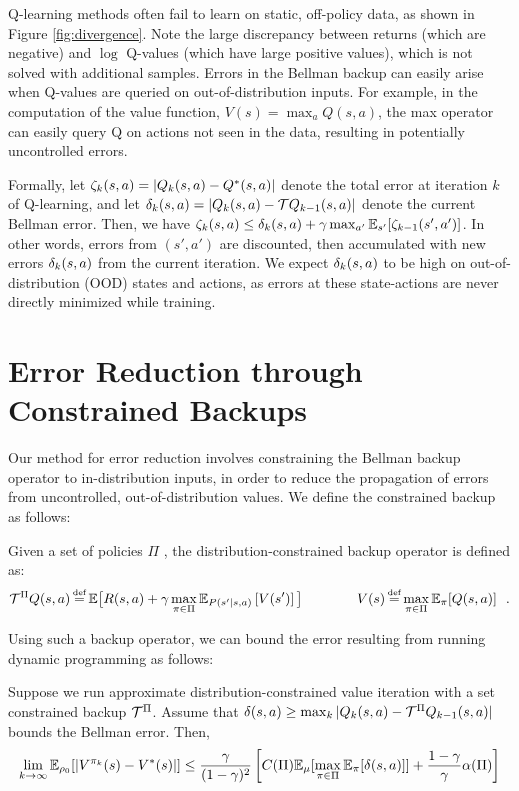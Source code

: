 \documentclass{article}
\begin{document}
Q-learning methods often fail to learn on static, off-policy data, as shown in Figure \ref{fig:divergence}. Note the large discrepancy between returns (which are negative) and $\log$ Q-values (which have large positive values), which is not solved with additional samples. Errors in the Bellman backup can easily arise when Q-values are queried on out-of-distribution inputs. For example, in the computation of the value function, $V(s) = \max_a Q(s,a)$, the max operator can easily query Q on actions not seen in the data, resulting in potentially uncontrolled errors.

Formally, let $\zeta_k(s, a) = |Q_k(s,a) - Q^*(s,a)|$ denote the total error at iteration $k$ of Q-learning, and let $\delta_k(s, a) = |Q_k(s,a) - \mathcal{T} Q_{k-1}(s,a)|$ denote the current Bellman error. Then, we have \mbox{$\zeta_k(s, a) \le \delta_k(s,a) + \gamma \max_{a'} \mathbb{E}_{s'}[\zeta_{k-1}(s',a')]$}. In other words, errors from $(s', a')$ are discounted, then accumulated with new errors $\delta_k(s, a)$ from the current iteration. We expect $\delta_k(s,a)$ to be high on out-of-distribution (OOD) states and actions, as errors at these state-actions are never directly minimized while training.



\vspace{-10pt}
\section{Error Reduction through Constrained Backups}
\vspace{-10pt}

Our method for error reduction involves constraining the Bellman backup operator to in-distribution inputs, in order to reduce the propagation of errors from uncontrolled, out-of-distribution values. We define the constrained backup as follows:
\begin{definition}
Given a set of policies $\Pi$
, the distribution-constrained backup operator is defined as:
\begin{align*}
\TPi Q(s, a) \defeq \expec \big[ R(s, a) + \gamma \max_{\pi \in \Pi} \expec_{\trans(s' | s, a)}\left[V(s') \right] \big]
\ \ \ \ \ \ \ \ \ \ \ \ 
V(s) \defeq \max_{\pi \in \Pi} \expec_{\pi}[Q(s, a)]\ \ .
\end{align*}
\end{definition}
Using such a backup operator, we can bound the error resulting from running dynamic programming as follows:
\begin{theorem}
\label{thm:avi_bound}
Suppose we run approximate distribution-constrained value iteration with a set constrained backup $\mathcal{T}^\Pi$. Assume that $\delta(s,a) \ge \max_k |Q_k(s,a) - \mathcal{T}^\Pi Q_{k-1}(s,a)|$ bounds the Bellman error. Then,
\[\lim_{k \to \infty} \mathbb{E}_{{\rho_0}}[|V^{\pi_k}(s) - V^*(s)|] \le
\frac{\gamma}{(1-\gamma)^2}\left[ C(\Pi)\mathbb{E}_\mu[\max_{\pi \in \Pi} \mathbb{E}_{\pi}[\delta(s,a)]] + \frac{1-\gamma}{\gamma}\alpha(\Pi) \right]
\]
\end{theorem}
\end{document}
